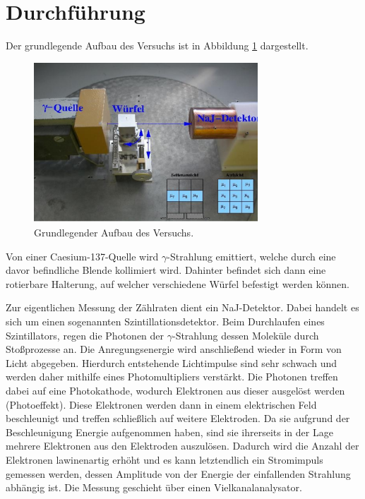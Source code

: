 \section{Durchführung}
\label{sec:Durchführung}

Der grundlegende Aufbau des Versuchs ist in Abbildung \ref{fig:aufbau} dargestellt.

\begin{figure}[H]
  \centering
  \includegraphics[height=6cm]{Aufbau.PNG}
  \caption{Grundlegender Aufbau des Versuchs. \cite{sample}}
  \label{fig:aufbau}
\end{figure}

Von einer Caesium-137-Quelle wird $\gamma$-Strahlung emittiert, welche durch eine
davor befindliche Blende kollimiert wird. Dahinter befindet sich dann eine rotierbare
Halterung, auf welcher verschiedene Würfel befestigt werden können.

Zur eigentlichen Messung der Zählraten dient ein NaJ-Detektor.
Dabei handelt es sich um einen sogenannten Szintillationsdetektor.
Beim Durchlaufen eines Szintillators, regen die Photonen der $\gamma$-Strahlung dessen
Moleküle durch Stoßprozesse an. Die Anregungsenergie wird anschließend wieder in Form
von Licht abgegeben. Hierdurch entstehende Lichtimpulse sind sehr schwach und
werden daher mithilfe eines Photomultipliers verstärkt. Die Photonen treffen dabei
auf eine Photokathode, wodurch Elektronen aus dieser ausgelöst werden (Photoeffekt).
Diese Elektronen werden dann in einem elektrischen Feld beschleunigt und treffen
schließlich auf weitere Elektroden. Da sie aufgrund der Beschleunigung Energie
aufgenommen haben, sind sie ihrerseits in der Lage mehrere
Elektronen aus den Elektroden auszulösen. Dadurch wird die Anzahl der Elektronen lawinenartig erhöht
und es kann letztendlich ein Stromimpuls gemessen werden, dessen Amplitude von der
Energie der einfallenden Strahlung abhängig ist. Die Messung geschieht über einen Vielkanalanalysator.

